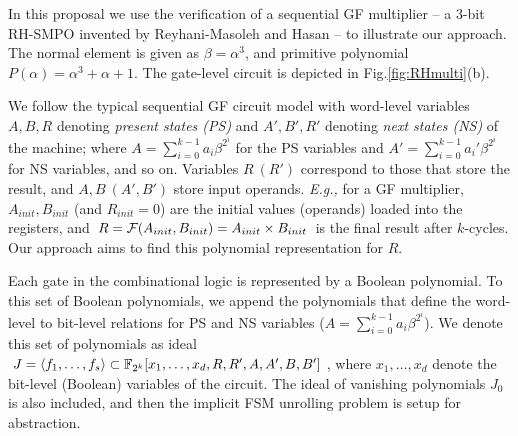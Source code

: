 
In this proposal we use the verification of a sequential GF multiplier -- 
a 3-bit RH-SMPO invented by Reyhani-Masoleh and Hasan\cite{RHmulti} -- to illustrate our approach.
The normal element is given as $\beta = \alpha^3$, and primitive polynomial $P(\alpha) = \alpha^3+\alpha+1$.
The gate-level circuit is depicted in Fig.\ref{fig:RHmulti}(b).

\begin{figure}[hbt]
\end{figure}

We follow  the typical sequential GF circuit model with word-level variables $A, B, R$
denoting {\it present states (PS)} and $A', B', R'$ denoting {\it next
  states (NS)} of the machine; where $A = \sum_{i=0}^{k-1} a_i \beta^{2^i}$
for the PS variables and $A' = \sum_{i=0}^{k-1} a_i'
\beta^{2^i}$ for NS variables, and so on.  Variables $R\ (R')$ correspond to those that 
store the result, and $A, B\ (A', B')$ store input operands. {\it E.g.,}
for a GF multiplier, $A_{init}, B_{init}$ (and $R_{init} =
0$) are the initial values (operands) loaded into the registers,  and
$R = {\mathcal{F}}(A_{init}, B_{init}) = A_{init} \times B_{init}$ is the final
result after $k$-cycles. Our approach aims to find this polynomial
representation for $R$.  

Each gate in the combinational logic is represented by a Boolean
polynomial. To 
this set of Boolean polynomials, we append the polynomials that define
the word-level to bit-level relations for PS and NS variables ($A =
\sum_{i=0}^{k-1} a_i \beta^{2^i}$). We denote this set of polynomials
as ideal $J = \langle 
f_1, \dots, f_s \rangle \subset {\mathbb{F}}_{2^k}[x_1, \dots, x_d, R, R', A, A', B,
  B']$, where $x_1, \dots, x_d$ denote the bit-level (Boolean) variables
  of the circuit. The ideal of vanishing polynomials $J_0$ is also included, and
then the implicit FSM unrolling problem is setup for abstraction. 

